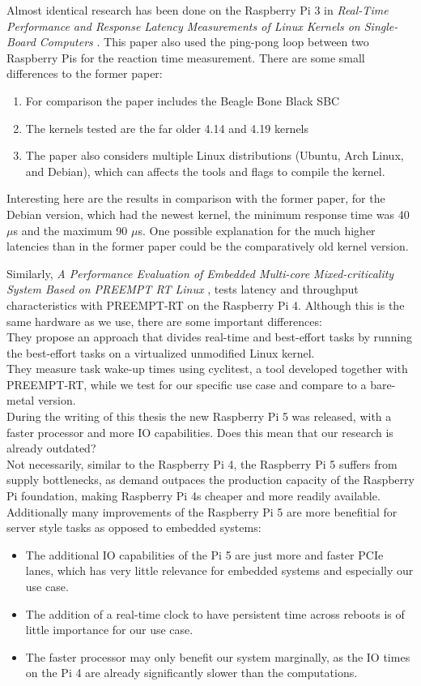 Almost identical research has been done on the Raspberry Pi 3 in \textit{Real-Time Performance and Response Latency Measurements of Linux Kernels on Single-Board Computers} \cite{computers10050064}.
This paper also used the ping-pong loop between two Raspberry Pis for the reaction time measurement.
There are some small differences to the former paper:
\begin{enumerate}
  \item For comparison the paper includes the Beagle Bone Black SBC
  \item The kernels tested are the far older 4.14 and 4.19 kernels
  \item The paper also considers multiple Linux distributions (Ubuntu, Arch Linux, and Debian), which can affects the tools and flags to compile the kernel.
\end{enumerate}
Interesting here are the results in comparison with the former paper, for the Debian version, which had the newest kernel, the minimum response time was 40$\mu$s and the maximum 90 $\mu$s.
One possible explanation for the much higher latencies than in the former paper could be the comparatively old kernel version.

Similarly, \textit{A Performance Evaluation of Embedded Multi-core Mixed-criticality System Based on PREEMPT RT Linux} \cite{Rasp4},
tests latency and throughput characteristics with PREEMPT-RT on the Raspberry Pi 4.
Although this is the same hardware as we use, there are some important differences:\\
They propose an approach that divides real-time and best-effort tasks by running the best-effort tasks on a virtualized unmodified Linux kernel.\\
They measure task wake-up times using cyclitest, a tool developed together with PREEMPT-RT, while we test for our specific use case and compare to a bare-metal version.\\

During the writing of this thesis the new Raspberry Pi 5 was released, with a faster processor and more IO capabilities.
Does this mean that our research is already outdated?\\
Not necessarily, similar to the Raspberry Pi 4, the Raspberry Pi 5 suffers from supply bottlenecks,
as demand outpaces the production capacity of the Raspberry Pi foundation, making Raspberry Pi 4s cheaper and more readily available.
Additionally many improvements of the Raspberry Pi 5 are more benefitial for server style tasks as opposed to embedded systems:
\begin{itemize}
  \item The additional IO capabilities of the Pi 5 are just more and faster PCIe lanes, which has very little relevance for embedded systems and especially our use case.
  \item The addition of a real-time clock to have persistent time across reboots is of little importance for our use case.
  \item The faster processor may only benefit our system marginally, as the IO times on the Pi 4 are already significantly slower than the computations.
\end{itemize}


